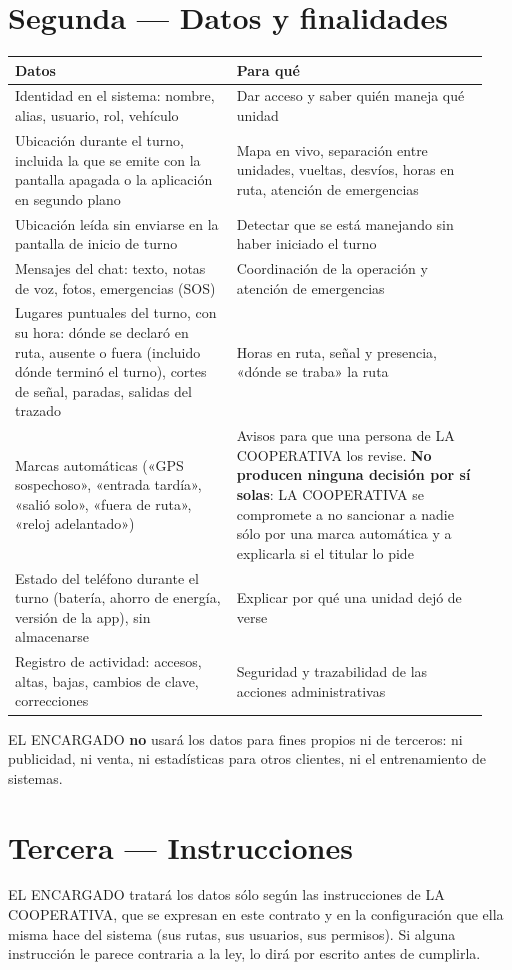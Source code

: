 \documentclass[10.5pt,a4paper]{article}
\begin{document}
\section{Segunda — Datos y finalidades}
\begin{longtable}{>{\raggedright}p{0.44\linewidth}>{\raggedright\arraybackslash}p{0.5\linewidth}}
\toprule
\textbf{Datos} & \textbf{Para qué}\\\midrule\endhead
Identidad en el sistema: nombre, alias, usuario, rol, vehículo & Dar acceso y saber quién maneja qué unidad\\
Ubicación durante el turno, incluida la que se emite con la pantalla apagada o la aplicación en segundo plano & Mapa en vivo, separación entre unidades, vueltas, desvíos, horas en ruta, atención de emergencias\\
Ubicación leída sin enviarse en la pantalla de inicio de turno & Detectar que se está manejando sin haber iniciado el turno\\
Mensajes del chat: texto, notas de voz, fotos, emergencias (SOS) & Coordinación de la operación y atención de emergencias\\
Lugares puntuales del turno, con su hora: dónde se declaró en ruta, ausente o fuera (incluido dónde terminó el turno), cortes de señal, paradas, salidas del trazado & Horas en ruta, señal y presencia, «dónde se traba» la ruta\\
Marcas automáticas («GPS sospechoso», «entrada tardía», «salió solo», «fuera de ruta», «reloj adelantado») & Avisos para que una persona de LA COOPERATIVA los revise. \textbf{No producen ninguna decisión por sí solas}: LA COOPERATIVA se compromete a no sancionar a nadie sólo por una marca automática y a explicarla si el titular lo pide\\
Estado del teléfono durante el turno (batería, ahorro de energía, versión de la app), sin almacenarse & Explicar por qué una unidad dejó de verse\\
Registro de actividad: accesos, altas, bajas, cambios de clave, correcciones & Seguridad y trazabilidad de las acciones administrativas\\
\bottomrule
\end{longtable}
EL ENCARGADO \textbf{no} usará los datos para fines propios ni de terceros: ni
publicidad, ni venta, ni estadísticas para otros clientes, ni el
entrenamiento de sistemas. 

\section{Tercera — Instrucciones}
EL ENCARGADO tratará los datos sólo según las instrucciones de LA COOPERATIVA,
que se expresan en este contrato y en la configuración que ella misma hace del
sistema (sus rutas, sus usuarios, sus permisos). Si alguna instrucción le
parece contraria a la ley, lo dirá por escrito antes de cumplirla.
\end{document}
